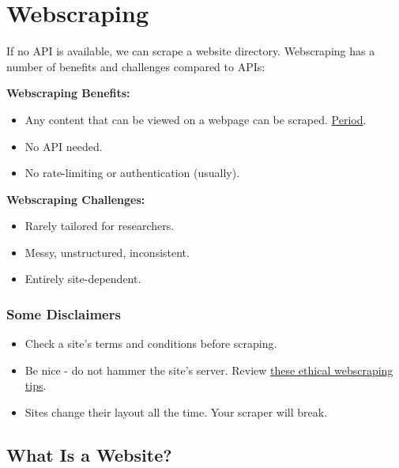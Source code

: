 \documentclass[
]{book}
\providecommand{\tightlist}{%
  \setlength{\itemsep}{0pt}\setlength{\parskip}{0pt}}
\begin{document}
\hypertarget{webscraping}{%
\section{Webscraping}\label{webscraping}}

If no API is available, we can scrape a website directory. Webscraping has a number of benefits and challenges compared to APIs:

\textbf{Webscraping Benefits:}

\begin{itemize}
\tightlist
\item
  Any content that can be viewed on a webpage can be scraped. \href{https://blog.hartleybrody.com/web-scraping/}{Period}.
\item
  No API needed.
\item
  No rate-limiting or authentication (usually).
\end{itemize}

\textbf{Webscraping Challenges:}

\begin{itemize}
\tightlist
\item
  Rarely tailored for researchers.
\item
  Messy, unstructured, inconsistent.
\item
  Entirely site-dependent.
\end{itemize}

\hypertarget{some-disclaimers}{%
\subsubsection{Some Disclaimers}\label{some-disclaimers}}

\begin{itemize}
\tightlist
\item
  Check a site's terms and conditions before scraping.
\item
  Be nice - do not hammer the site's server. Review \href{https://towardsdatascience.com/ethics-in-web-scraping-b96b18136f01}{these ethical webscraping tips}.
\item
  Sites change their layout all the time. Your scraper will break.
\end{itemize}

\hypertarget{what-is-a-website}{%
\subsection{What Is a Website?}\label{what-is-a-website}}
\end{document}
